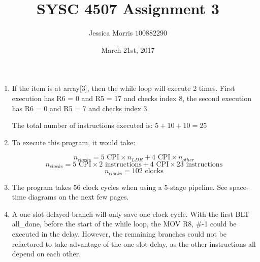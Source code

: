 \documentclass{article}
\title{SYSC 4507 Assignment 3}
\date{March 21st, 2017}
\author{Jessica Morris \(100882290\)}
\begin{document}
\maketitle

\begin{enumerate}

\item If the item is at array[3], then the while loop will execute 2 times. First execution has R6 = 0 and R5 = 17 and checks index 8, the second execution has R6 = 0 and R5 = 7 and checks index 3.

The total number of instructions executed is: $ 5 + 10 + 10 = 25 $

\item To execute this program, it would take:

$$ n_{clocks} = 5 \text{ CPI} \times n_{LDR} + 4 \text{ CPI} \times n_{other} $$
$$ n_{clocks} = 5 \text{ CPI} \times 2 \text{ instructions} + 4 \text{ CPI} \times 23 \text{ instructions} $$
$$ n_{clocks} = 102 \text{ clocks} $$

\item The program takes 56 clock cycles when using a 5-stage pipeline. See space-time diagrams on the next few pages.

\item A one-slot delayed-branch will only save one clock cycle. With the first BLT all\_done, before the start of the while loop, the MOV R8, \#-1 could be executed in the delay. However, the remaining branches could not be refactored to take advantage of the one-slot delay, as the other instructions all depend on each other.

\end{enumerate}
\end{document}
